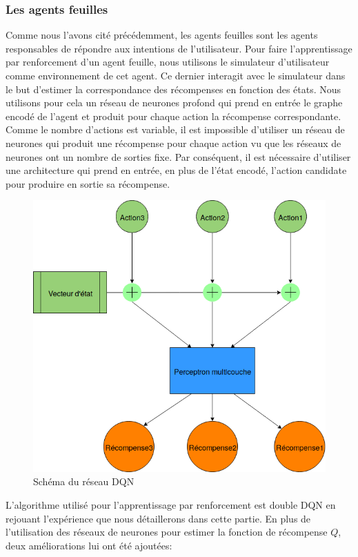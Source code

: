 \subsubsection*{Les agents feuilles}
Comme nous l'avons cité précédemment, les agents feuilles sont les agents responsables de répondre aux intentions de l'utilisateur. Pour faire l'apprentissage par renforcement d'un agent feuille, nous utilisons le simulateur d'utilisateur comme environnement de cet agent. Ce dernier interagit avec le simulateur dans le but d'estimer la correspondance des récompenses en fonction des états. Nous utilisons pour cela un réseau de neurones profond qui prend en entrée le graphe encodé de l'agent et produit pour chaque action la récompense correspondante. Comme le nombre d'actions est variable, il est impossible d'utiliser un réseau de neurones qui produit une récompense pour chaque action vu que les réseaux de neurones ont un nombre de sorties fixe. Par conséquent, il est nécessaire d'utiliser une architecture qui prend en entrée, en plus de l'état encodé, l'action candidate pour produire en sortie sa récompense.
\begin{figure}[H]
	\centering
	\includegraphics[width=0.5\linewidth]{images/Conception/DM/time_dist.png}
	\caption{Schéma du réseau DQN}
\end{figure}\label{time_dist}
L'algorithme utilisé pour l'apprentissage par renforcement est double DQN en rejouant l'expérience que nous détaillerons dans cette partie. En plus de l'utilisation des réseaux de neurones pour estimer la fonction de récompense $Q$, deux améliorations lui ont été ajoutées:

